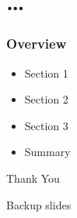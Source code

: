 

\section{\ldots}

\begin{frame}
\frametitle{Overview}
\begin{itemize}
  \item Section 1
  \item Section 2 
  \item Section 3
  \item Summary
\end{itemize}
\end{frame}

\begin{frame}
\Huge{\centerline{Thank You}}
\end{frame}

\begin{frame}
\Huge{\centerline{Backup slides}}
\end{frame}




